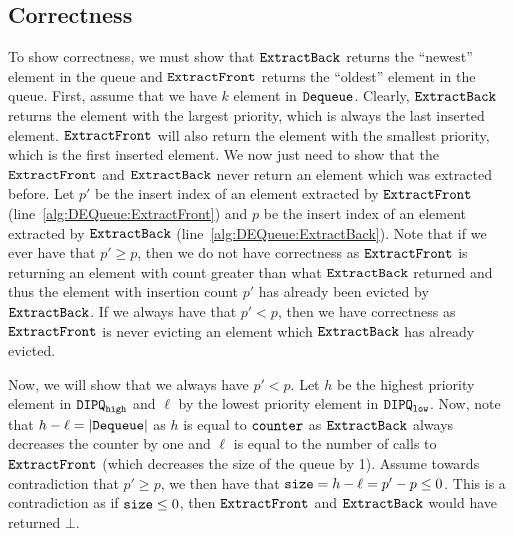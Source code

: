 \subsection{Correctness}
To show correctness, we must show that $\texttt{ExtractBack}$ returns the ``newest'' element in the queue and $\texttt{ExtractFront}$ returns the ``oldest'' element in the queue.
First, assume that we have $k$ element in $\texttt{Dequeue}$. 
Clearly, $\texttt{ExtractBack}$ returns the element with the largest priority, which is always the last inserted element.
$\texttt{ExtractFront}$ will also return the element with the smallest priority, which is the first inserted element.
We now just need to show that the $\texttt{ExtractFront}$ and $\texttt{ExtractBack}$
never return an element which was extracted before.
Let $p'$ be the insert index of an element extracted by $\texttt{ExtractFront}$ (line~\ref{alg:DEQueue:ExtractFront}) and $p$ be the insert index of an element extracted by $\texttt{ExtractBack}$ (line~\ref{alg:DEQueue:ExtractBack}).
Note that if we ever have that $p' \geq p$, then we do not have correctness
as $\texttt{ExtractFront}$ is returning an element with count greater than what $\texttt{ExtractBack}$ returned
and thus the element with insertion count $p'$ has already been evicted by $\texttt{ExtractBack}$.
If we always have that $p' < p$, then we have correctness as $\texttt{ExtractFront}$ is never evicting an element
which $\texttt{ExtractBack}$ has already evicted.

Now, we will show that we always have $p' < p$.
Let $h$ be the highest priority element in $\texttt{DIPQ}_{\texttt{high}}$ and $\ell$ by the lowest priority element in $\texttt{DIPQ}_{\texttt{low}}$.
Now, note that $h - \ell = |\texttt{Dequeue}|$ as $h$ is equal to $\texttt{counter}$ as $\texttt{ExtractBack}$ always decreases the counter by one and
$\ell$ is equal to the number of calls to $\texttt{ExtractFront}$ (which decreases the size of the queue by 1).
Assume towards contradiction that $p' \geq p$, we then have that $\texttt{size} = h - \ell = p' - p \leq 0$.
This is a contradiction as if $\texttt{size} \leq 0$, then $\texttt{ExtractFront}$ and $\texttt{ExtractBack}$ would have returned $\bot$.
